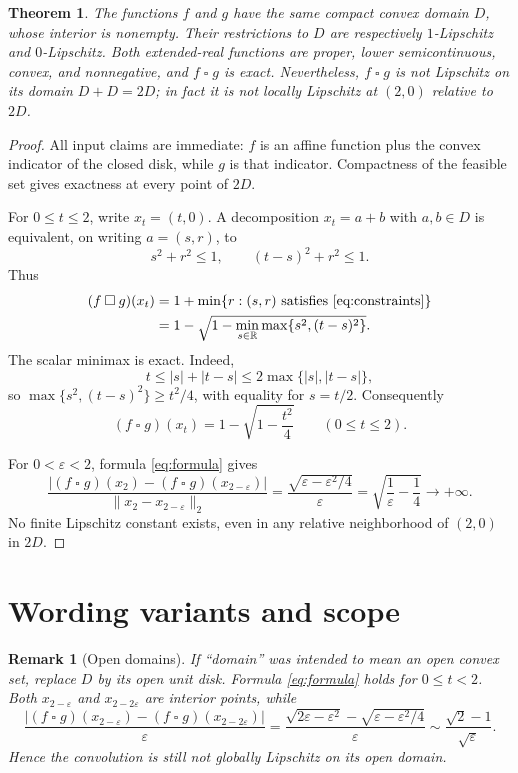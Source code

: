 \documentclass[11pt]{article}
\newtheorem{theorem}{Theorem}
\newtheorem{remark}{Remark}
\newcommand{\R}{\mathbb R}
\newcommand{\ic}{\mathbin{\square}}
\begin{document}
\begin{theorem}
The functions $f$ and $g$ have the same compact convex domain $D$, whose
interior is nonempty.  Their restrictions to $D$ are respectively
$1$-Lipschitz and $0$-Lipschitz.  Both extended-real functions are proper,
lower semicontinuous, convex, and nonnegative, and $f\ic g$ is exact.
Nevertheless, $f\ic g$ is not Lipschitz on its domain $D+D=2D$; in fact it is
not locally Lipschitz at $(2,0)$ relative to $2D$.
\end{theorem}

\begin{proof}
All input claims are immediate: $f$ is an affine function plus the convex
indicator of the closed disk, while $g$ is that indicator.  Compactness of
the feasible set gives exactness at every point of $2D$.

For $0\leq t\leq2$, write $x_t=(t,0)$.  A decomposition
$x_t=a+b$ with $a,b\in D$ is equivalent, on writing $a=(s,r)$, to
\begin{equation}\label{eq:constraints}
 s^2+r^2\leq1,
 \qquad
 (t-s)^2+r^2\leq1.
\end{equation}
Thus
\begin{align*}
 (f\ic g)(x_t)
 &=1+\min\{r:(s,r)\text{ satisfies \eqref{eq:constraints}}\}\\
 &=1-\sqrt{1-\min_{s\in\R}\max\{s^2,(t-s)^2\}}.
\end{align*}
The scalar minimax is exact.  Indeed,
\[
 t\leq |s|+|t-s|\leq2\max\{|s|,|t-s|\},
\]
so $\max\{s^2,(t-s)^2\}\geq t^2/4$, with equality for $s=t/2$.
Consequently
\begin{equation}\label{eq:formula}
 (f\ic g)(x_t)=1-\sqrt{1-\frac{t^2}{4}}
 \qquad(0\leq t\leq2).
\end{equation}

For $0<\varepsilon<2$, formula \eqref{eq:formula} gives
\[
 \frac{|(f\ic g)(x_2)-(f\ic g)(x_{2-\varepsilon})|}
      {\|x_2-x_{2-\varepsilon}\|_2}
 =\frac{\sqrt{\varepsilon-\varepsilon^2/4}}{\varepsilon}
 =\sqrt{\frac1\varepsilon-\frac14}\longrightarrow+\infty.
\]
No finite Lipschitz constant exists, even in any relative neighborhood of
$(2,0)$ in $2D$.
\end{proof}

\section*{Wording variants and scope}

\begin{remark}[Open domains]
If ``domain'' was intended to mean an open convex set, replace $D$ by its
open unit disk.  Formula \eqref{eq:formula} holds for $0\leq t<2$.  Both
$x_{2-\varepsilon}$ and $x_{2-2\varepsilon}$ are interior points, while
\[
 \frac{|(f\ic g)(x_{2-\varepsilon})-(f\ic g)(x_{2-2\varepsilon})|}
 {\varepsilon}
 =\frac{\sqrt{2\varepsilon-\varepsilon^2}
 -\sqrt{\varepsilon-\varepsilon^2/4}}{\varepsilon}
 \sim\frac{\sqrt2-1}{\sqrt\varepsilon}.
\]
Hence the convolution is still not globally Lipschitz on its open domain.
\end{remark}
\end{document}
